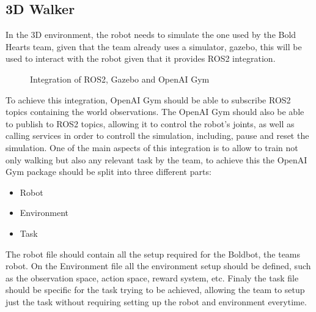\begin{itemize}
\end{itemize}

\subsection{3D Walker}
In the 3D environment, the robot needs to simulate the one used by the Bold Hearts team, given that the team already uses a simulator, gazebo, this will be used to interact with the robot given that it provides ROS2 integration.
\begin{figure}[H]
    \centering
    \caption{Integration of ROS2, Gazebo and OpenAI Gym}
\end{figure}

To achieve this integration, OpenAI Gym should be able to subscribe ROS2 topics containing the world observations. 
The OpenAI Gym should also be able to publish to ROS2 topics, allowing it to control the robot's joints, as well as calling services in order to controll the simulation, including, pause and reset the simulation.
One of the main aspects of this integration is to allow to train not only walking but also any relevant task by the team, to achieve this the OpenAI Gym package should be split into three different parts:
\begin{itemize}
    \item Robot
    \item Environment
    \item Task
\end{itemize}
The robot file should contain all the setup required for the Boldbot, the teams robot. On the Environment file all the environment setup should be defined, such as the observation space, action space, reward system, etc. 
Finaly the task file should be specific for the task trying to be achieved, allowing the team to setup just the task without requiring setting up the robot and environment everytime.
\cite{ros-gym} %

